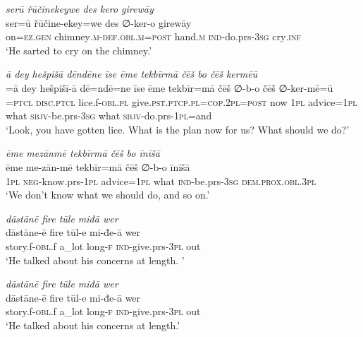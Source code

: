\ea \label{BP.153}
\textit{serū řūčinekeywe des kero girewāy} \\ 
\gll ser=ū řūčine-ekey=we des ∅-ker-o girewāy \\ 
 on\textsc{=ez.gen} chimney\textsc{.m}\textsc{-def}\textsc{.obl}\textsc{.m}\textsc{=\textsc{post}} hand\textsc{.m} \textsc{ind-}do.prs\textsc{-3sg} cry\textsc{.inf} \\ 
\glt `He sarted to cry on the chimney.'
\z 
 
\ea \label{BP.156}
\textit{ā dey hešpišā dēndēne īse ēme tekbīrmā čēš bo čēš kermēū} \\ 
\gll =ā dey hešpišī-ā dē=ndē=ne īse ēme tekbīr=mā čēš ∅-b-o čēš ∅-ker-mē=ū \\ 
=\textsc{ptcl} \textsc{disc.ptcl} lice.f\textsc{-obl}\textsc{.pl} give\textsc{.pst}\textsc{.ptcp}\textsc{.pl}\textsc{=cop}.\textsc{2pl}\textsc{=\textsc{post}} now \textsc{1pl} advice\textsc{=\textsc{1pl}} what \textsc{sbjv-}be.prs\textsc{-3sg} what \textsc{sbjv-}do.prs\textsc{-\textsc{1pl}}=and \\ 
\glt `Look, you have gotten lice. What is the plan now for us? What should we do?'
\z 
 
\ea \label{BP.157}
\textit{ēme mezānmē tekbīrmā čēš bo īnīšā} \\ 
\gll ēme me-zān-mē tekbīr=mā čēš ∅-b-o īnīšā \\ 
 \textsc{1pl} \textsc{neg-}know.prs\textsc{-\textsc{1pl}} advice\textsc{=\textsc{1pl}} what \textsc{ind-}be.prs\textsc{-3sg} \textsc{dem.prox}\textsc{.obl}\textsc{.3pl} \\ 
\glt `We don’t know what we should do, and so on.'
\z 
 
\ea \label{BP.158}
\textit{dāstānē fire tūle miđā wer} \\ 
\gll dāstāne-ē fire tūl-e mi-đe-ā wer \\ 
 story.f\textsc{-obl}.f a\_lot long\textsc{-f} \textsc{ind-}give.prs\textsc{-3pl} out \\ 
\glt `He talked about his concerns at length. '
\z 
 
\ea \label{BP.159}
\textit{dāstānē fire tūle miđā wer} \\ 
\gll dāstāne-ē fire tūl-e mi-đe-ā wer \\ 
 story.f\textsc{-obl}.f a\_lot long\textsc{-f} \textsc{ind-}give.prs\textsc{-3pl} out \\ 
\glt `He talked about his concerns at length.'
\z 
 
